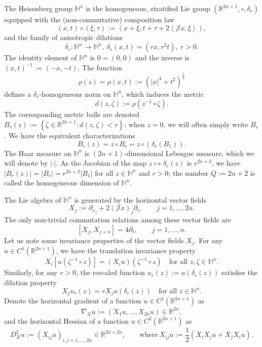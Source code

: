 \documentclass[12pt]{amsart}
\newcommand{\R}{{\mathbb R}}
\newcommand{\J}{\mathcal{J}}
\newcommand{\la}{\left\langle}
\newcommand{\ra}{\right\rangle}
\def \H {{\mathbb H}}
\def \Hn {{\mathbb H}^n}
\def \la {\left\langle }
\def \ra {\right\rangle}
\begin{document}
The Heisenberg group $\Hn$ is the homogeneous, stratified Lie group $(\R^{2n+1}, \circ, \delta_r)$ equipped with the (non-commutative) composition law
\[
(x,t) \circ (\xi, \tau) := \left(x + \xi, t + \tau + 2\la \J x, \xi \ra \right),
\]
and the family of anisotropic dilations
\[
\delta_{r} : \Hn \rightarrow \Hn, \ \delta_{r}(x,t) = (r x, r^2 t), \ r>0.
\]
The identity element of $\Hn$ is $0=(0,0)$ and the inverse is $(x,t)^{-1} := (-x,-t)$. The function 
$$
\rho(z) = \rho(x,t) := (|x|^4 + t^2)^{\frac{1}{4}}
$$
defines a $\delta_r$-homogeneous norm on $\Hn$, which induces the metric
\begin{equation}\label{defmetric}
d(z, \zeta) := \rho(z^{-1} \circ \zeta).
\end{equation}
The corresponding metric balls are denoted $B_r(z) := \left\{\zeta \in \R^{2n+1} : d(z, \zeta) < r \right\}$; when $z=0$, we will often simply write $B_r$. We have the equivalent characterizations 
$$B_r(z) =  z \circ B_r = z \circ (\delta_r (B_1)).$$
The Haar measure on $\Hn$ is $(2n+1)$-dimensional Lebesgue measure, which we will denote by $| \cdot |$. As the Jacobian of the map $z \mapsto \delta_r (z)$ is $r^{2n+2}$, we have $|B_r(z)| = |B_r| = r^{2n+2}|B_1|$ for all $z\in\Hn$ and $r>0$; the number $Q := 2n+2$ is called the homogeneous dimension of $\H^n$.

The Lie algebra of $\Hn$ is generated by the horizontal vector fields
\begin{equation}\label{vector-fields-of-Hn}
X_j := \partial_{x_j} + 2(\J x)_j \partial_t, \qquad j = 1,\ldots, 2n.
\end{equation}
The only non-trivial commutation relations among these vector fields are
\[
[X_j, X_{j+n}] = 4 \partial_t, \qquad j = 1, \ldots, n.
\]
Let us note some invariance properties of the vector fields $X_j$. For any $u \in C^1(\R^{2n+1})$, we have the translation invariance property
\[X_i [u(\zeta^{-1}\circ z)] = (X_i u) (\zeta^{-1}\circ z) \quad \text{for all } z, \zeta \in \H^n.\]
Similarly, for any $r > 0$, the rescaled function $u_r(z) := u(\delta_r(z))$ satisfies the dilation property
\[X_j u_r(z) = r X_j u(\delta_r(z)) \quad \text{for all } z \in \H^n.
\]
Denote the horizontal gradient of a function $u \in C^1(\R^{2n+1})$ as
\begin{equation}\label{horizontal-gradient}
\nabla_X u := (X_1 u, \ldots, X_{2n} u) \in \R^{2n},
\end{equation}
and the horizontal Hessian of a function $u \in C^2(\R^{2n+1})$ as
\begin{equation}\label{horizontal-Hessian}
D^2_X u := \left(X_{ij} u \right)_{i,j = 1,\ldots, 2n} \in \R^{2n \times 2n}, \qquad \text{where} \ X_{ij} u := \frac{1}{2}\left(X_i X_j u + X_j X_i u \right).
\end{equation}
\end{document}
